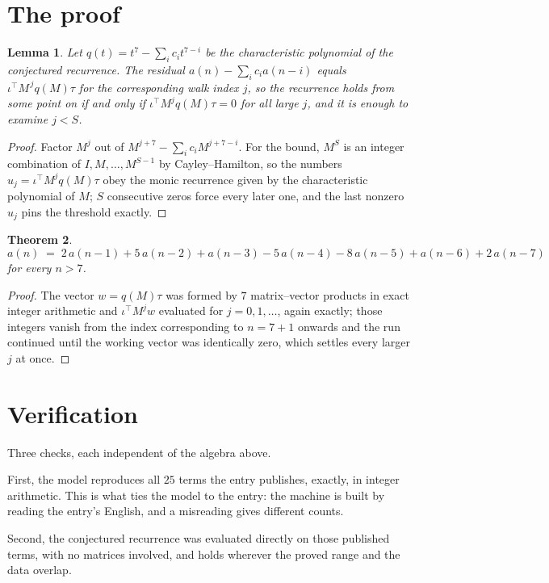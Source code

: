 \documentclass[11pt,a4paper]{article}
\theoremstyle{plain}
\newtheorem{theorem}{Theorem}
\newtheorem{lemma}[theorem]{Lemma}
\theoremstyle{definition}
\begin{document}
\section{The proof}

\begin{lemma}\label{lem:crit}
Let $q(t)=t^{7}-\sum_i c_it^{7-i}$ be the characteristic polynomial of the
conjectured recurrence. The residual $a(n)-\sum_ic_ia(n-i)$ equals
$\iota^{\!\top}M^{\,j}q(M)\tau$ for the corresponding walk index $j$, so the recurrence
holds from some point on if and only if $\iota^{\!\top}M^{j}q(M)\tau=0$ for all large $j$,
and it is enough to examine $j<S$.
\end{lemma}

\begin{proof}
Factor $M^{j}$ out of $M^{j+7}-\sum_ic_iM^{j+7-i}$. For the bound, $M^{S}$
is an integer combination of $I,M,\dots,M^{S-1}$ by Cayley--Hamilton, so the numbers
$u_j=\iota^{\!\top}M^{j}q(M)\tau$ obey the monic recurrence given by the characteristic
polynomial of $M$; $S$ consecutive zeros force every later one, and the last nonzero $u_j$
pins the threshold exactly.
\end{proof}

\begin{theorem}
\[
a(n)\;=\;2\,a(n-1) + 5\,a(n-2) + a(n-3) - 5\,a(n-4) - 8\,a(n-5) + a(n-6) + 2\,a(n-7)
\]
for every $n>7$.
\end{theorem}

\begin{proof}
The vector $w=q(M)\tau$ was formed by $7$ matrix--vector products in exact integer
arithmetic and $\iota^{\!\top}M^{j}w$ evaluated for $j=0,1,\dots$, again exactly; those
integers vanish from the index corresponding to $n=7+1$ onwards and the run continued
until the working vector was identically zero, which settles every larger $j$ at once.
\end{proof}

\section{Verification}

Three checks, each independent of the algebra above.

First, the model reproduces all $25$ terms the entry publishes, exactly, in integer
arithmetic. This is what ties the model to the entry: the machine is built by reading the
entry's English, and a misreading gives different counts.

Second, the conjectured recurrence was evaluated directly on those published terms, with no
matrices involved, and holds wherever the proved range and the data overlap.
\end{document}

